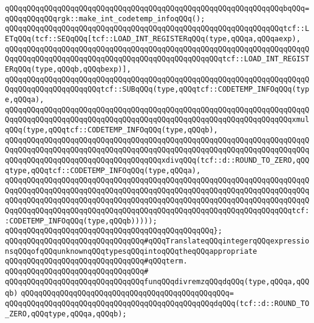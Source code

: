 \verb|qQQqqQQqqQQqqQQqqQQqqQQqqQQqqQQqqQQqqQQqqQQqqQQqqQQqqQQqqQQqqQQqbqQQq=qQQqqQQqqQQqrgk::make_int_codetemp_infoqQQq();|\newline
\newline
\verb|qQQqqQQqqQQqqQQqqQQqqQQqqQQqqQQqqQQqqQQqqQQqqQQqqQQqqQQqqQQqqQQqtcf::LETqQQq(tcf::SEQqQQq[tcf::LOAD_INT_REGISTERqQQq(type,qQQqa,qQQqaexp),|\newline
\verb|qQQqqQQqqQQqqQQqqQQqqQQqqQQqqQQqqQQqqQQqqQQqqQQqqQQqqQQqqQQqqQQqqQQqqQQqqQQqqQQqqQQqqQQqqQQqqQQqqQQqqQQqqQQqqQQqqQQqqQQqtcf::LOAD_INT_REGISTERqQQq(type,qQQqb,qQQqbexp)],|\newline
\verb|qQQqqQQqqQQqqQQqqQQqqQQqqQQqqQQqqQQqqQQqqQQqqQQqqQQqqQQqqQQqqQQqqQQqqQQqqQQqqQQqqQQqqQQqqQQqtcf::SUBqQQq(type,qQQqtcf::CODETEMP_INFOqQQq(type,qQQqa),|\newline
\verb|qQQqqQQqqQQqqQQqqQQqqQQqqQQqqQQqqQQqqQQqqQQqqQQqqQQqqQQqqQQqqQQqqQQqqQQqqQQqqQQqqQQqqQQqqQQqqQQqqQQqqQQqqQQqqQQqqQQqqQQqqQQqqQQqqQQqqQQqxmulqQQq(type,qQQqtcf::CODETEMP_INFOqQQq(type,qQQqb),|\newline
\verb|qQQqqQQqqQQqqQQqqQQqqQQqqQQqqQQqqQQqqQQqqQQqqQQqqQQqqQQqqQQqqQQqqQQqqQQqqQQqqQQqqQQqqQQqqQQqqQQqqQQqqQQqqQQqqQQqqQQqqQQqqQQqqQQqqQQqqQQqqQQqqQQqqQQqqQQqqQQqqQQqqQQqqQQqqQQqqQQqxdivqQQq(tcf::d::ROUND_TO_ZERO,qQQqtype,qQQqtcf::CODETEMP_INFOqQQq(type,qQQqa),|\newline
\verb|qQQqqQQqqQQqqQQqqQQqqQQqqQQqqQQqqQQqqQQqqQQqqQQqqQQqqQQqqQQqqQQqqQQqqQQqqQQqqQQqqQQqqQQqqQQqqQQqqQQqqQQqqQQqqQQqqQQqqQQqqQQqqQQqqQQqqQQqqQQqqQQqqQQqqQQqqQQqqQQqqQQqqQQqqQQqqQQqqQQqqQQqqQQqqQQqqQQqqQQqqQQqqQQqqQQqqQQqqQQqqQQqqQQqqQQqqQQqqQQqqQQqqQQqqQQqqQQqqQQqqQQqqQQqqQQqqQQqtcf::CODETEMP_INFOqQQq(type,qQQqb)))));|\newline
\verb|qQQqqQQqqQQqqQQqqQQqqQQqqQQqqQQqqQQqqQQqqQQqqQQq};|\newline
\newline
\newline
\verb|qQQqqQQqqQQqqQQqqQQqqQQqqQQqqQQq#qQQqTranslateqQQqintegerqQQqexpressionsqQQqofqQQqunknownqQQqtypesqQQqintoqQQqtheqQQqappropriate|\newline
\verb|qQQqqQQqqQQqqQQqqQQqqQQqqQQqqQQq#qQQqterm.|\newline
\verb|qQQqqQQqqQQqqQQqqQQqqQQqqQQqqQQq#|\newline
\verb|qQQqqQQqqQQqqQQqqQQqqQQqqQQqqQQqfunqQQqdivremzqQQqdqQQq(type,qQQqa,qQQqb)|\newline
\verb|qQQqqQQqqQQqqQQqqQQqqQQqqQQqqQQqqQQqqQQqqQQqqQQq=|\newline
\verb|qQQqqQQqqQQqqQQqqQQqqQQqqQQqqQQqqQQqqQQqqQQqqQQqdqQQq(tcf::d::ROUND_TO_ZERO,qQQqtype,qQQqa,qQQqb);|\newline
